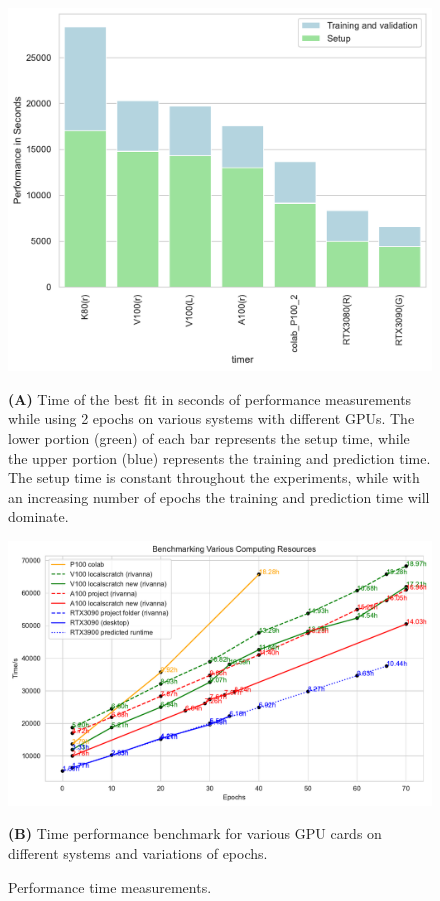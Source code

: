 \documentclass[utf8]{FrontiersinVancouver} %
\begin{document}
\begin{figure}[p]

  \centering\includegraphics[width=0.70\columnwidth]{images/Graphics_Cards_BestFit_bar}

  {\bf (A)} Time of the best fit in seconds of performance measurements while using 2 epochs on various systems with different GPUs. The lower portion (green) of each bar represents the setup time, while the upper portion (blue) represents the training and prediction time. The setup time is constant throughout the experiments, while with an increasing number of epochs the training and prediction time will dominate. 
  
  
  \bigskip

  \centering\includegraphics[width=0.9\columnwidth]{images/Benchmark_comp_resource_new}

  {\bf (B)} Time performance benchmark for various GPU cards on different systems and variations of epochs.
  
  
    
  \caption{Performance time measurements.}
  \label{fig:performance-projection}
\end{figure}
\end{document}
